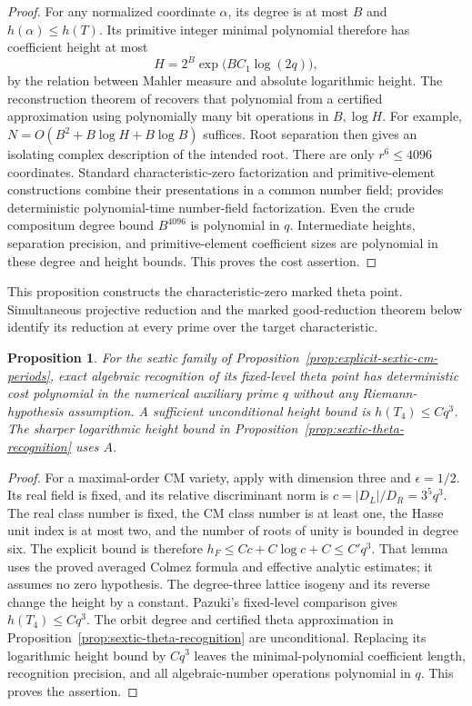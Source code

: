 \documentclass[11pt]{article}
\newtheorem{proposition}[theorem]{Proposition}
\theoremstyle{definition}
\theoremstyle{remark}
\begin{document}
\begin{proof}
For any normalized coordinate \(\alpha\), its degree is at most
\(B\) and \(h(\alpha)\leq h(T)\). Its primitive integer minimal
polynomial therefore has coefficient height at most
\[
 H=2^B\exp\bigl(B C_1\log(2q)\bigr),
\]
by the relation between Mahler measure and absolute logarithmic height.
The reconstruction theorem of
\citet[Theorem~1.19, p.~241]{KannanLenstraLovasz1988}
recovers that polynomial from a certified approximation using
polynomially many bit operations in \(B,\log H\). For example,
\(N=O(B^2+B\log H+B\log B)\) suffices. Root separation then gives
an isolating complex description of the intended root. There are only
\(r^6\leq4096\) coordinates. Standard characteristic-zero factorization and
primitive-element constructions combine their presentations in a
common number field; \citet[Theorem~4.5, pp.~253--254]{Lenstra1983}
provides deterministic polynomial-time number-field factorization.
Even the crude compositum degree bound \(B^{4096}\) is polynomial in
\(q\). Intermediate heights, separation precision, and primitive-element
coefficient sizes are polynomial in these degree and height bounds.
This proves the cost assertion.
\end{proof}

This proposition constructs the characteristic-zero marked theta point. Simultaneous projective reduction and the marked good-reduction theorem below identify its reduction at every prime over the target characteristic.


\begin{proposition}\label{prop:unconditional-cm-recognition}
For the sextic family of Proposition~\ref{prop:explicit-sextic-cm-periods},
exact algebraic recognition of its fixed-level theta point has
deterministic cost polynomial in the numerical auxiliary prime \(q\)
without any Riemann-hypothesis assumption. A sufficient unconditional
height bound is \(h(T_4)\le Cq^3\). The sharper logarithmic height
bound in Proposition~\ref{prop:sextic-theta-recognition} uses \(A\).
\end{proposition}
\begin{proof}
For a maximal-order CM variety, apply
\citet[Lemma~7.10, printed p.~63; equation~(7.7), p.~62]{VonKanelKret2023}
with dimension three and \(\epsilon=1/2\). Its real field is fixed,
and its relative discriminant norm is
\(c=|D_L|/D_R=3^5q^3\). The real class number is fixed, the CM
class number is at least one, the Hasse unit index is at most two,
and the number of roots of unity is bounded in degree six. The explicit
bound is therefore \(h_F\le Cc+C\log c+C\le C'q^3\).
That lemma uses the proved averaged Colmez formula and effective
analytic estimates; it assumes no zero hypothesis. The degree-three
lattice isogeny and its reverse change the height by a constant.
Pazuki's fixed-level comparison gives \(h(T_4)\le Cq^3\).
The orbit degree and certified theta approximation in
Proposition~\ref{prop:sextic-theta-recognition} are unconditional.
Replacing its logarithmic height bound by \(Cq^3\) leaves the
minimal-polynomial coefficient length, recognition precision, and
all algebraic-number operations polynomial in \(q\). This proves
the assertion.
\end{proof}
\end{document}
